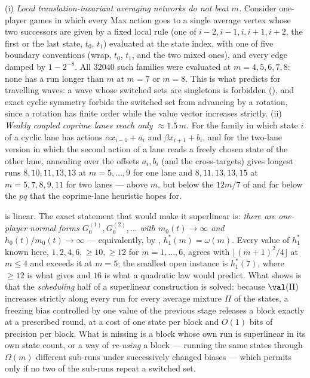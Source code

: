 \begin{remark}\label{oph:negative}
(i) \emph{Local translation-invariant averaging networks do not beat $m$.} Consider
one-player games in which every Max action goes to a single average vertex whose two
successors are given by a fixed local rule (one of $i-2,i-1,i,i+1,i+2$, the first or
the last state, $t_0$, $t_1$) evaluated at the state index, with one of five boundary
conventions (wrap, $t_0$, $t_1$, and the two mixed ones), and every edge damped by
$1-2^{-8}$. All $32040$ such families were evaluated at $m=4,5,6,7,8$: none has a run
longer than $m$ at $m=7$ or $m=8$. This is what  predicts for
travelling waves: a wave whose switched sets are singletons is forbidden
(), and exact cyclic symmetry forbids the switched set from
advancing by a rotation, since a rotation has finite order while the value vector
increases strictly.
(ii) \emph{Weakly coupled coprime lanes reach only $\approx1.5\,m$.} For the family in
which state $i$ of a cyclic lane has actions $\alpha x_{i-1}+a_i$ and
$\beta x_{i+1}+b_i$, and for the two-lane version in which the second action of a lane
reads a freely chosen state of the other lane, annealing over the offsets
$a_i,b_i$ (and the cross-targets) gives longest runs $8,10,11,13,13$ at
$m=5,\dots,9$ for one lane and $8,11,13,13,15$ at $m=5,7,8,9,11$ for two lanes ---
above $m$, but below the $12m/7$ of  and far below the $pq$ that the
coprime-lane heuristic hopes for.
\end{remark}

\begin{remark}\label{oph:gap}
 is linear. The exact statement that would make it superlinear is:
\emph{there are one-player normal forms $G_0^{(1)},G_0^{(2)},\dots$ with
$m_0(t)\to\infty$ and $h_0(t)/m_0(t)\to\infty$} --- equivalently, by
, $h^{\ast}_{1}(m)=\omega(m)$. Every value of $h^{\ast}_{1}$ known
here, $1,2,4,6,\ge10,\ge12$ for $m=1,\dots,6$, agrees with $\lfloor(m+1)^{2}/4\rfloor$
at $m\le4$ and exceeds it at $m=5$; the smallest open instance is $h^{\ast}_{1}(7)$,
where $\ge12$ is what  gives and $16$ is what a quadratic law would
predict. What  shows is that the \emph{scheduling} half of a
superlinear construction is solved: because $\val(\Pi)$ increases strictly along every
run for every average mixture $\Pi$ of the states, a freezing bias controlled by one
value of the previous stage releases a block exactly at a prescribed round, at a cost
of one state per block and $O(1)$ bits of precision per block. What is missing is a
block whose own run is superlinear in its own state count, or a way of \emph{re-using}
a block --- running the same states through $\Omega(m)$ different sub-runs under
successively changed biases --- which  permits only if no two of the
sub-runs repeat a switched set.
\end{remark}